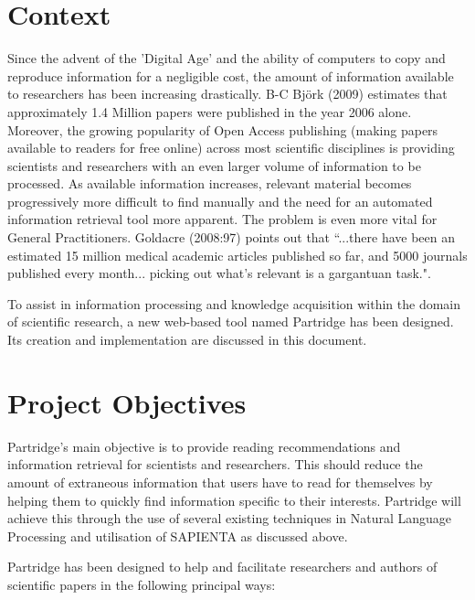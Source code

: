 %
%
\section{Context}

Since the advent of the 'Digital Age' and the ability of computers to copy and
reproduce information for a negligible cost, the amount of information
available to researchers has been increasing drastically.  B-C Bj\"{o}rk (2009)
estimates that approximately 1.4 Million papers were published in the year 2006
alone\cite{bjork2009}. Moreover, the growing popularity of Open Access
publishing (making papers available to readers for free online\cite{Suber2012})
across most scientific disciplines\cite{bjork2009}\cite{harnad2004comparing} is
providing scientists and researchers with an even larger volume of information
to be processed. As available information increases, relevant material becomes
progressively more difficult to find manually and the need for an automated
information retrieval tool more apparent. The problem is even more vital for
General Practitioners. Goldacre (2008:97) points out that ``...there have been an
estimated 15 million medical academic articles published so far, and 5000
journals published every month... picking out what's relevant is a gargantuan
task."\cite{goldacre2008bad}.

To assist in information processing and knowledge acquisition within the domain
of scientific research, a new web-based tool named Partridge has been designed. Its
creation and implementation are discussed in this document.

\section{Project Objectives}
\label{sec:objectives}
Partridge's main objective is to provide reading recommendations and
information retrieval for scientists and researchers. This should reduce the
amount of extraneous information that users have to read for themselves by
helping them to quickly find information specific to their interests.
Partridge will achieve this through the use of several existing techniques in
Natural Language Processing and utilisation of SAPIENTA as discussed above.

Partridge has been designed to help and facilitate researchers and authors of
scientific papers in the following principal ways:

